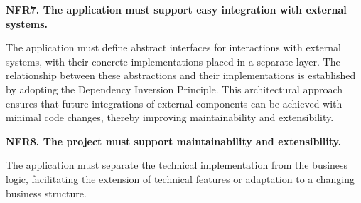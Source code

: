 \textbf{NFR7. The application must support easy integration with external systems.}

The application must define abstract interfaces for interactions with external systems, with their concrete implementations placed in a separate layer. The relationship between these abstractions and their implementations is established by adopting the Dependency Inversion Principle. This architectural approach ensures that future integrations of external components can be achieved with minimal code changes, thereby improving maintainability and extensibility.

\textbf{NFR8. The project must support maintainability and extensibility.}

The application must separate the technical implementation from the business logic, facilitating the extension of technical features or adaptation to a changing business structure. 

